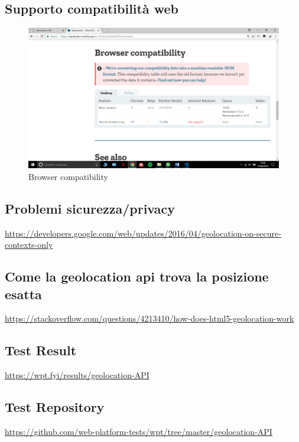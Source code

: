 \documentclass[italian]{article}
\begin{document}
	\subsection{Supporto compatibilità web}
	\begin{figure}
		\centering
		\includegraphics[width=1\linewidth]{web1}
		\caption{Browser compatibility}
		\label{fig:Browser compatibility}
	\end{figure}
	
	\subsection{Problemi sicurezza/privacy}
	\url{https://developers.google.com/web/updates/2016/04/geolocation-on-secure-contexts-only}
	
	\subsection{Come la geolocation api trova la posizione esatta}
	\url{https://stackoverflow.com/questions/4213410/how-does-html5-geolocation-work}
	
	\subsection{Test Result}
	\url{https://wpt.fyi/results/geolocation-API}
	
	\subsection{Test Repository}
	\url{https://github.com/web-platform-tests/wpt/tree/master/geolocation-API}
	
\end{document}
